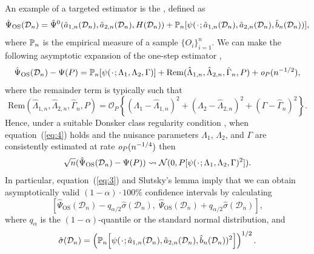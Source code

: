 \documentclass[a4,danish]{article}
\newcommand{\data}{\ensuremath{\mathcal{D}}}
\begin{document}
An example of a targeted estimator is the , defined as
\begin{equation}
    \label{eq:one-step-def}
    \hat{\Psi}_{\text{OS}}(\data_n)
    =
    \tilde{\Psi}^0(\hat{a}_{1,n}(\data_n), \hat{a}_{2,n}(\data_n),
    H(\data_n))
    + \empmeas{[\psi(\blank; \hat{a}_{1,n}(\data_n), \hat{a}_{2,n}(\data_n),
      \hat{b}_n(\data_n) )]},
\end{equation}
where \( \mathbb{P}_n \) is the empirical measure of a sample \(\{O_i\}_{i=1}^n\).
We can make the following asymptotic expansion of the one-step estimator
\citep{pfanzagl1985contributions,fisher2021visually,kennedy2022semiparametric},
\begin{equation*}
  \hat{\Psi}_{\text{OS}}(\data_n)- \Psi(P)
  =  \empmeas{[\psi(\blank ; \Lambda_1, \Lambda_2, \Gamma)]}
  +\mathrm{Rem}{(\hat{\Lambda}_{1,n},\hat{\Lambda}_{2,n},  \hat{\Gamma}_n, P)} + \smallO_{P}(n^{-1/2}),
\end{equation*}
where the remainder term is typically such that
\citep{van2003unified,rytgaard2022continuous}
\begin{equation}
  \label{eq:4}
  \mathrm{Rem}{(\hat{\Lambda}_{1,n},\hat{\Lambda}_{2,n},  \hat{\Gamma}_n, P)}
  = \mathcal{O}_P{
    \left\{
      (\Lambda_1-\hat{\Lambda}_{1,n})^2
      +
      (\Lambda_2-\hat{\Lambda}_{2,n})^2
      +
      (\Gamma-\hat{\Gamma}_{n})^2
    \right\}
  }.
\end{equation}
Hence, under a suitable Donsker class regularity condition
\citep{bickel1993efficient,kennedy2016semiparametric}, when
equation~(\ref{eq:4}) holds and the nuisance parameters $\Lambda_1$,
$\Lambda_2$, and $\Gamma$ are consistently estimated at rate
\( \textit{o}_P{(n^{-1/4})} \) then
\begin{equation}
  \label{eq:3}
  \sqrt{n}(\hat{\Psi}_{\text{OS}}(\data_n)- \Psi(P)) \weakly \mathcal{N}(0,
  P{[\psi(\blank; \Lambda_1, \Lambda_2, \Gamma)^2]}).
\end{equation}
In particular, equation~(\ref{eq:3}) and Slutsky's lemma imply that we can
obtain asymptotically valid \((1-\alpha)\cdot100\%\) confidence intervals by
calculating
\begin{equation*}
  \left[
    \hat{\Psi}_{\text{OS}}(\data_n) - q_{\alpha/2} \hat{\sigma}(\data_n) ,
    \;
    \hat{\Psi}_{\text{OS}}(\data_n) + q_{\alpha/2} \hat{\sigma}(\data_n)
  \right],
\end{equation*}
where \( q_{\alpha} \) is the \( (1-\alpha) \)-quantile or the standard normal
distribution, and
\begin{equation*}
  \hat{\sigma}(\data_n) = 
  \left(
    \empmeas{
      \left[
        \psi(\blank; \hat{a}_{1,n}(\data_n), \hat{a}_{2,n}(\data_n),
        \hat{b}_n(\data_n))^2
      \right]}
  \right)^{1/2}.
\end{equation*}
\end{document}
